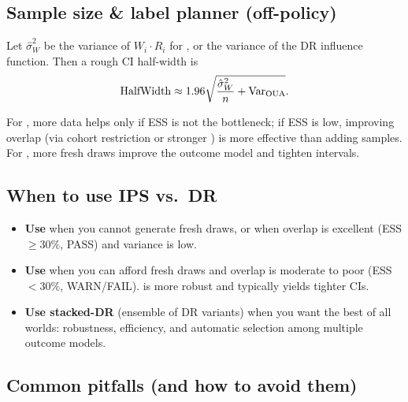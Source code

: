 \subsection{Sample size \& label planner (off-policy)}

Let $\hat{\sigma}_W^2$ be the variance of $W_i \cdot R_i$ for \ips, or the variance of the DR influence function. Then a rough CI half-width is
\begin{equation}
\text{HalfWidth} \approx 1.96 \sqrt{\frac{\hat{\sigma}_W^2}{n} + \operatorname{Var}_{\text{OUA}}}.
\end{equation}

For \ips, more data helps only if ESS is not the bottleneck; if ESS is low, improving overlap (via cohort restriction or stronger \simcal) is more effective than adding samples. For \dr, more fresh draws improve the outcome model and tighten intervals.

\subsection{When to use IPS vs.\ DR}

\begin{itemize}
\item \textbf{Use \ips{}} when you cannot generate fresh draws, or when overlap is excellent (ESS $\ge 30\%$, PASS) and variance is low.
\item \textbf{Use \dr{}} when you can afford fresh draws and overlap is moderate to poor (ESS $< 30\%$, WARN/FAIL). \dr{} is more robust and typically yields tighter CIs.
\item \textbf{Use stacked-DR} (ensemble of DR variants) when you want the best of all worlds: robustness, efficiency, and automatic selection among multiple outcome models.
\end{itemize}

\subsection{Common pitfalls (and how to avoid them)}

